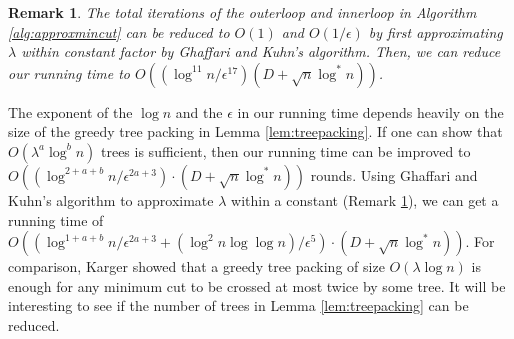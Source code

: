 \documentclass[11pt]{article}
\newtheorem{remark}[theorem]{Remark}
\begin{document}
\begin{remark}\label{rmk:combinedGK} The total iterations of the outerloop and innerloop in Algorithm \ref{alg:approxmincut} can be reduced to $O(1)$ and $O(1/ \epsilon)$ by first approximating $\lambda$ within constant factor by Ghaffari and Kuhn's algorithm. Then, we can reduce our running time to $O((\log^{11}n / \epsilon^{17})(D+\sqrt{n}\log^{*} n))$.\end{remark}

The exponent of the $\log n$ and the $\epsilon$ in our running time depends heavily on the size of the greedy tree packing in Lemma \ref{lem:treepacking}. If one can show that $O(\lambda^{a} \log^b n)$ trees is sufficient, then our running time can be improved to $O((\log^{2+a+b} n / \epsilon^{2a+3})\cdot(D+ \sqrt{n} \log^{*} n) )$ rounds. Using Ghaffari and Kuhn's algorithm to approximate $\lambda$ within a constant (Remark \ref{rmk:combinedGK}), we can get a running time of $O((\log^{1+a+b} n / \epsilon^{2a+3} + (\log^2 n \log \log n)/\epsilon^5)\cdot(D+ \sqrt{n} \log^{*} n) )$. For comparison, Karger \cite{Karger2000} showed that a greedy tree packing of size $O(\lambda \log n)$ is enough for any minimum cut to be crossed at most twice by some tree. It will be interesting to see if the number of trees in Lemma \ref{lem:treepacking} can be reduced.



\end{document}
